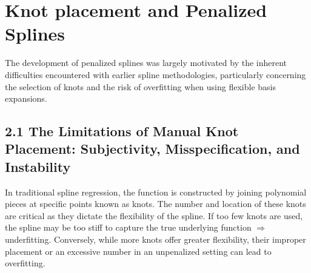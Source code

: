 \documentclass[11pt, a4paper]{article}
\begin{document}
\newpage
\section{Knot placement and Penalized Splines}
The development of penalized splines was largely motivated by the inherent difficulties encountered with earlier spline methodologies, particularly concerning the selection of knots and the risk of overfitting when using flexible basis expansions. 

\subsection{2.1 The Limitations of Manual Knot Placement: Subjectivity, Misspecification, and Instability}
In traditional spline regression, the function is constructed by joining polynomial pieces at specific points known as knots. The number and location of these knots are critical as they dictate the flexibility of the spline. If too few knots are used, the spline may be too stiff to capture the true underlying function $\Rightarrow $ underfitting. Conversely, while more knots offer greater flexibility, their improper placement or an excessive number in an unpenalized setting can lead to overfitting.
\end{document}
